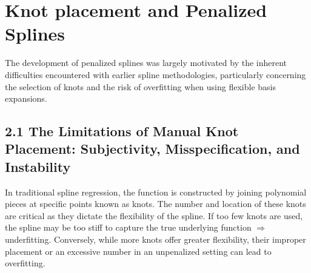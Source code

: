 \documentclass[11pt, a4paper]{article}
\begin{document}
\newpage
\section{Knot placement and Penalized Splines}
The development of penalized splines was largely motivated by the inherent difficulties encountered with earlier spline methodologies, particularly concerning the selection of knots and the risk of overfitting when using flexible basis expansions. 

\subsection{2.1 The Limitations of Manual Knot Placement: Subjectivity, Misspecification, and Instability}
In traditional spline regression, the function is constructed by joining polynomial pieces at specific points known as knots. The number and location of these knots are critical as they dictate the flexibility of the spline. If too few knots are used, the spline may be too stiff to capture the true underlying function $\Rightarrow $ underfitting. Conversely, while more knots offer greater flexibility, their improper placement or an excessive number in an unpenalized setting can lead to overfitting.
\end{document}
